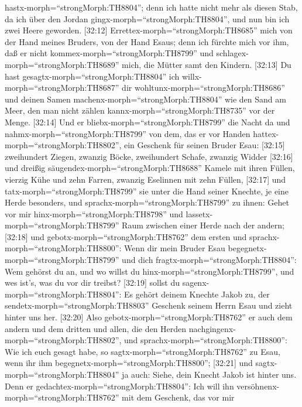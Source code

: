 hastx-morph=``strongMorph:TH8804''; denn ich hatte nicht mehr als diesen
Stab, da ich über den Jordan gingx-morph=``strongMorph:TH8804'', und nun
bin ich zwei Heere geworden.  {[}32:12{]}
Errettex-morph=``strongMorph:TH8685'' mich von der Hand meines Bruders,
von der Hand Esaus; denn ich fürchte mich vor ihm, daß er nicht
kommex-morph=``strongMorph:TH8799'' und
schlagex-morph=``strongMorph:TH8689'' mich, die Mütter samt den Kindern.
 {[}32:13{]} Du hast gesagtx-morph=``strongMorph:TH8804''
ich willx-morph=``strongMorph:TH8687'' dir
wohltunx-morph=``strongMorph:TH8686'' und deinen Samen
machenx-morph=``strongMorph:TH8804'' wie den Sand am Meer, den man nicht
zählen kannx-morph=``strongMorph:TH8735'' vor der Menge. 
{[}32:14{]} Und er bliebx-morph=``strongMorph:TH8799'' die Nacht da und
nahmx-morph=``strongMorph:TH8799'' von dem, das er vor Handen
hattex-morph=``strongMorph:TH8802'', ein Geschenk für seinen Bruder
Esau:  {[}32:15{]} zweihundert Ziegen, zwanzig Böcke,
zweihundert Schafe, zwanzig Widder  {[}32:16{]} und dreißig
säugendex-morph=``strongMorph:TH8688'' Kamele mit ihren Füllen, vierzig
Kühe und zehn Farren, zwanzig Eselinnen mit zehn Füllen, 
{[}32:17{]} und tatx-morph=``strongMorph:TH8799'' sie unter die Hand
seiner Knechte, je eine Herde besonders, und
sprachx-morph=``strongMorph:TH8799'' zu ihnen: Gehet vor mir
hinx-morph=``strongMorph:TH8798'' und
lassetx-morph=``strongMorph:TH8799'' Raum zwischen einer Herde nach der
andern;  {[}32:18{]} und
gebotx-morph=``strongMorph:TH8762'' dem ersten und
sprachx-morph=``strongMorph:TH8800'': Wenn dir mein Bruder Esau
begegnetx-morph=``strongMorph:TH8799'' und dich
fragtx-morph=``strongMorph:TH8804'': Wem gehörst du an, und wo willst du
hinx-morph=``strongMorph:TH8799'', und wes ist's, was du vor dir
treibst?  {[}32:19{]} sollst du
sagenx-morph=``strongMorph:TH8804'': Es gehört deinem Knechte Jakob zu,
der sendetx-morph=``strongMorph:TH8803'' Geschenk seinem Herrn Esau und
zieht hinter uns her.  {[}32:20{]} Also
gebotx-morph=``strongMorph:TH8762'' er auch dem andern und dem dritten
und allen, die den Herden nachgingenx-morph=``strongMorph:TH8802'', und
sprachx-morph=``strongMorph:TH8800'': Wie ich euch gesagt habe, so
sagtx-morph=``strongMorph:TH8762'' zu Esau, wenn ihr ihm
begegnetx-morph=``strongMorph:TH8800'';  {[}32:21{]} und
sagtx-morph=``strongMorph:TH8804'' ja auch: Siehe, dein Knecht Jakob ist
hinter uns. Denn er gedachtex-morph=``strongMorph:TH8804'': Ich will ihn
versöhnenx-morph=``strongMorph:TH8762'' mit dem Geschenk, das vor mir
